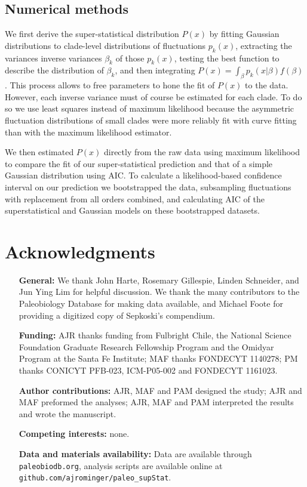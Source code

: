 \documentclass[12pt]{article}
\begin{document}
\subsection*{Numerical methods} \label{sec:numMeth} We first derive
the super-statistical distribution $P(x)$ by fitting Gaussian
distributions to clade-level distributions of fluctuations $p_k(x)$,
extracting the variances inverse variances $\beta_k$ of those
$p_k(x)$, testing the best function to describe the distribution of
$\beta_k$, and then integrating
$P(x) = \int_{\beta}p_k(x | \beta) f(\beta)$. This process allows to
free parameters to hone the fit of $P(x)$ to the data.  However, each
inverse variance must of course be estimated for each clade.  To do so
we use least squares instead of maximum likelihood because the
asymmetric fluctuation distributions of small clades were more reliably
fit with curve fitting than with the maximum likelihood estimator.

We then estimated $P(x)$ directly from the raw data using maximum
likelihood to compare the fit of our super-statistical prediction and
that of a simple Gaussian distribution using AIC. To calculate a
likelihood-based confidence interval on our prediction we bootstrapped
the data, subsampling fluctuations with replacement from all orders
combined, and calculating AIC of the superstatistical and Gaussian
models on these bootstrapped datasets.





\section*{Acknowledgments}
\begin{itemize}
\item[{\bf General:}] We thank John Harte, Rosemary Gillespie, Linden
  Schneider, and Jun Ying Lim for helpful discussion. We thank the
  many contributors to the Paleobiology Database for making data
  available, and Michael Foote for providing a digitized copy of
  Sepkoski's compendium.
\item[{\bf Funding:}] AJR thanks funding from Fulbright Chile, the
  National Science Foundation Graduate Research Fellowship Program and
  the Omidyar Program at the Santa Fe Institute; MAF thanks FONDECYT
  1140278; PM thanks CONICYT PFB-023, ICM-P05-002 and FONDECYT
  1161023.
\item[{\bf Author contributions:}] AJR, MAF and PAM designed the
  study; AJR and MAF preformed the analyses; AJR, MAF and PAM
  interpreted the results and wrote the manuscript.
\item[{\bf Competing interests:}] none.
\item[{\bf Data and materials availability:}] Data are available
  through {\tt paleobiodb.org}, analysis scripts are available online
  at {\tt github.com/ajrominger/paleo\_supStat}.
\end{itemize}
\end{document}
